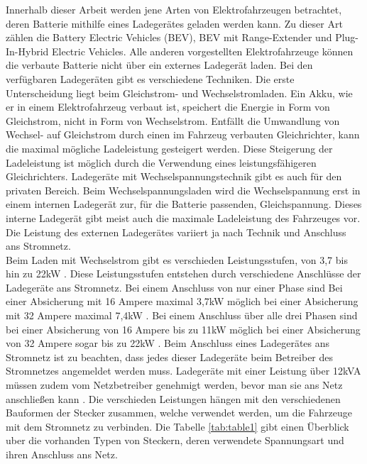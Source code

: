Innerhalb dieser Arbeit werden jene Arten von Elektrofahrzeugen betrachtet, deren Batterie mithilfe eines Ladegerätes geladen werden kann. Zu dieser Art zählen die Battery Electric Vehicles (BEV), BEV mit Range-Extender und Plug-In-Hybrid Electric Vehicles. Alle anderen vorgestellten Elektrofahrzeuge können die verbaute Batterie nicht über ein externes Ladegerät laden. Bei den verfügbaren Ladegeräten gibt es verschiedene Techniken. Die erste Unterscheidung liegt beim Gleichstrom- und Wechselstromladen. Ein Akku, wie er in einem Elektrofahrzeug verbaut ist, speichert die Energie in Form von Gleichstrom, nicht in Form von Wechselstrom. Entfällt die Umwandlung von Wechsel- auf Gleichstrom durch einen im Fahrzeug verbauten Gleichrichter, kann die maximal mögliche Ladeleistung gesteigert werden. Diese Steigerung der Ladeleistung ist möglich durch die Verwendung eines leistungsfähigeren Gleichrichters. Ladegeräte mit Wechselspannungstechnik gibt es auch für den privaten Bereich. Beim Wechselspannungsladen wird die Wechselspannung erst in einem internen Ladegerät zur, für die Batterie passenden, Gleichspannung. Dieses interne Ladegerät gibt meist auch die maximale Ladeleistung des Fahrzeuges vor. Die Leistung des externen Ladegerätes variiert ja nach Technik und Anschluss ans Stromnetz. \\
Beim Laden mit Wechselstrom gibt es verschieden Leistungsstufen, von 3,7 bis hin zu 22kW \cite{laden_1}. Diese Leistungsstufen entstehen durch verschiedene Anschlüsse der Ladegeräte ans Stromnetz. Bei einem Anschluss von nur einer Phase sind Bei einer Absicherung mit 16 Ampere maximal 3,7kW möglich bei einer Absicherung mit 32 Ampere maximal 7,4kW \cite{laden_1}. Bei einem Anschluss über alle drei Phasen sind bei einer Absicherung von 16 Ampere bis zu 11kW möglich bei einer Absicherung von 32 Ampere sogar bis zu 22kW \cite{laden_1}. Beim Anschluss eines Ladegerätes ans Stromnetz ist zu beachten, dass jedes dieser Ladegeräte beim Betreiber des Stromnetzes angemeldet werden muss. Ladegeräte mit einer Leistung über 12kVA müssen zudem vom Netzbetreiber genehmigt werden, bevor man sie ans Netz anschließen kann \cite{Lader_anschluss}. Die verschieden Leistungen hängen mit den verschiedenen Bauformen der Stecker zusammen, welche verwendet werden, um die Fahrzeuge mit dem Stromnetz zu verbinden. Die Tabelle \ref{tab:table1} gibt einen Überblick uber die vorhanden Typen von Steckern, deren verwendete Spannungsart und ihren Anschluss ans Netz.
